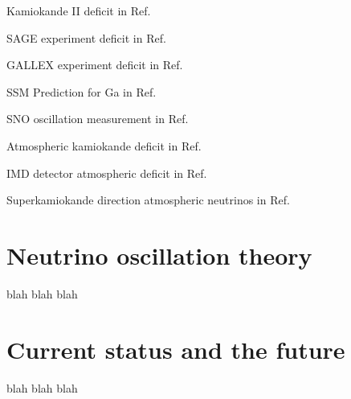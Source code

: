 Kamiokande II deficit in Ref.~\cite{hirata1989}

SAGE experiment deficit in Ref.~\cite{abazov1991}

GALLEX experiment deficit in Ref.~\cite{anselmann1994}

SSM Prediction for Ga in Ref.~\cite{bahcall1988}

SNO oscillation measurement in Ref.~\cite{ahmad2002}

Atmospheric kamiokande deficit in Ref.~\cite{hirata1988}

IMD detector atmospheric deficit in Ref.~\cite{becker1992}

Superkamiokande direction atmospheric neutrinos in Ref.~\cite{becker1992}

\section{Neutrino oscillation theory}
\label{sec:theorytheory}

blah blah blah

\section{Current status and the future}
\label{sec:theorystatus}

blah blah blah